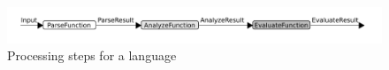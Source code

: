 \begin{figure}[h]
  \includegraphics[width=\textwidth]{unit-flow}
  \caption{Processing steps for a language }
\end{figure}

\section{}
\label{sec:visitor}

\section{}
\label{sec:eval-strat}

